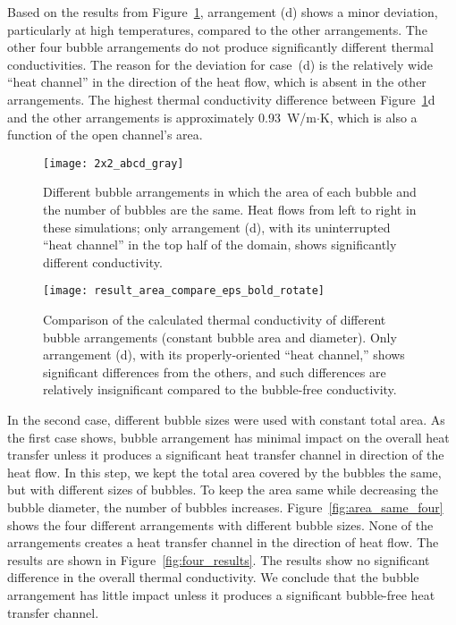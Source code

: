 Based on the results from Figure~\ref{fig:five_figures}, arrangement (d) shows a minor deviation, particularly at high temperatures, compared to the other arrangements. The other four bubble arrangements do not produce significantly different thermal conductivities. The reason for the deviation for case~(d) is the relatively wide ``heat channel'' in the direction of the heat flow, which is absent in the other arrangements. The highest thermal conductivity difference between Figure~\ref{fig:five_figures}d and the other arrangements is approximately 0.93~W/m$\cdot$K, which is also a function of the open channel's area.

\begin{figure}
	\centering
	\texttt{[image: 2x2\_abcd\_gray]}
    \caption[Different bubble arrangements in which the area of each bubble and
      the number of bubbles are the same]{Different bubble arrangements in which the area of each bubble and
      the number of bubbles are the same. Heat flows from left to right in
      these simulations; only arrangement (d), with its uninterrupted ``heat
      channel'' in the top half of the domain, shows significantly different
      conductivity.}
	\label{fig:five_figures} 
\end{figure}

\begin{figure}
	\centering
	\texttt{[image: result\_area\_compare\_eps\_bold\_rotate]}
    \caption[Comparison of the calculated thermal conductivity of different
        bubble arrangements (constant bubble area and diameter).]{Comparison of the calculated thermal conductivity of different
        bubble arrangements (constant bubble area and diameter). Only
        arrangement (d), with its properly-oriented ``heat channel,'' shows significant
        differences from the others, and such differences are relatively
        insignificant compared to the bubble-free conductivity.}
	\label{fig:five_results}
\end{figure}

In the second case, different bubble sizes were used with constant total area. As the first case shows, bubble arrangement has minimal impact on the overall heat transfer unless it produces a significant heat transfer channel in direction of the heat flow. In this step, we kept the total area covered by the bubbles the same, but with different sizes of bubbles. To keep the area same while decreasing the bubble diameter, the number of bubbles increases. Figure~\ref{fig:area_same_four} shows the four different arrangements with different bubble sizes. None of the arrangements creates a heat transfer channel in the direction of heat flow. The results are shown in Figure~\ref{fig:four_results}. The results show no significant difference in the overall thermal conductivity. We conclude that the bubble arrangement has little impact unless it produces a significant bubble-free heat transfer channel. 

